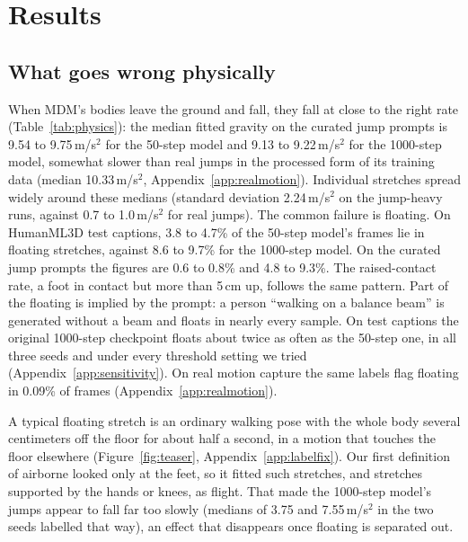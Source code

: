 \section{Results}
\label{sec:results}

\subsection{What goes wrong physically}
\label{sec:physics}

\begin{table}[t]
\centering
\caption{Physics of the generated motions (range over seeds; 1,000 motions per seed). Jump gravity is the median fitted fall rate of unsupported airborne stretches that do fall (real flight: 9.81\,m/s$^2$); floating counts unsupported stretches that barely fall. Here ``jump prompts'' are the 14 curated jump prompts of the main runs (Section~\ref{sec:models}); elsewhere the term means the jump-heavy runs.}
\label{tab:physics}

\end{table}

When MDM's bodies leave the ground and fall, they fall at close to the right rate (Table~\ref{tab:physics}): the median fitted gravity on the curated jump prompts is 9.54 to 9.75\,m/s$^2$ for the 50-step model and 9.13 to 9.22\,m/s$^2$ for the 1000-step model, somewhat slower than real jumps in the processed form of its training data (median 10.33\,m/s$^2$, Appendix~\ref{app:realmotion}). Individual stretches spread widely around these medians (standard deviation 2.24\,m/s$^2$ on the jump-heavy runs, against 0.7 to 1.0\,m/s$^2$ for real jumps). The common failure is floating. On HumanML3D test captions, 3.8 to 4.7\% of the 50-step model's frames lie in floating stretches, against 8.6 to 9.7\% for the 1000-step model. On the curated jump prompts the figures are 0.6 to 0.8\% and 4.8 to 9.3\%. The raised-contact rate, a foot in contact but more than 5\,cm up, follows the same pattern. Part of the floating is implied by the prompt: a person ``walking on a balance beam'' is generated without a beam and floats in nearly every sample. On test captions the original 1000-step checkpoint floats about twice as often as the 50-step one, in all three seeds and under every threshold setting we tried (Appendix~\ref{app:sensitivity}). On real motion capture the same labels flag floating in 0.09\% of frames (Appendix~\ref{app:realmotion}).

A typical floating stretch is an ordinary walking pose with the whole body several centimeters off the floor for about half a second, in a motion that touches the floor elsewhere (Figure~\ref{fig:teaser}, Appendix~\ref{app:labelfix}). Our first definition of airborne looked only at the feet, so it fitted such stretches, and stretches supported by the hands or knees, as flight. That made the 1000-step model's jumps appear to fall far too slowly (medians of 3.75 and 7.55\,m/s$^2$ in the two seeds labelled that way), an effect that disappears once floating is separated out.


